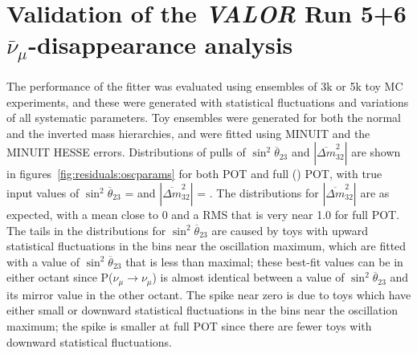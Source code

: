 \clearpage

\section {Validation of the {\em VALOR} Run 5+6  $\bar{\nu}_{\mu}$-disappearance analysis}
\label{sec:validation}

The performance of the fitter was evaluated using ensembles of 3k or 5k toy MC experiments, and these were
generated with statistical fluctuations and variations of all \NSyst{} systematic parameters.
Toy ensembles were generated for both the normal and the inverted mass hierarchies, and were fitted 
using MINUIT and the MINUIT HESSE errors. Distributions of pulls of $\sin^{2}\overline{\theta}_{23}$ 
and $|\overline{\Delta m}^2_{32}|$ are shown in figures~\ref{fig:residuals:oscparams} for both \FakePot{} 
POT and full (\TargetFullPot{}) POT, with true input values of  
$\sin^{2}\overline{\theta}_{23}$ = \NonReactorMixingTwoThreeNH{} and $|\overline{\Delta m}^2_{32}|$ = \NonReactorDmsqNH{}. 
The distributions for $|\overline{\Delta m}^2_{32}|$ are as expected, with a mean close to 0 and a RMS 
that is very near 1.0 for full POT. The tails in the distributions for $\sin^{2}\overline{\theta}_{23}$ are 
caused by toys with upward statistical fluctuations in the bins near the oscillation maximum, which 
are fitted with a value of $\sin^{2}\overline{\theta}_{23}$ that is less than maximal; these best-fit 
values can be in either octant since P($\nu_{\mu} \rightarrow \nu_{\mu}$) is almost identical between a 
value of $\sin^{2}\overline{\theta}_{23}$ and its mirror value in the other octant. The spike near zero 
is due to toys which have either small or downward statistical fluctuations in the bins near the 
oscillation maximum; the spike is smaller at full POT since there are fewer toys with downward statistical 
fluctuations.   

